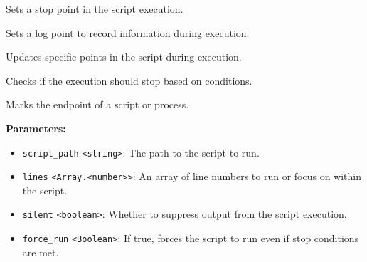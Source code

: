 \documentclass[12pt,a4paper]{article}
\begin{document}
\noindent Sets a stop point in the script execution.

\vspace{5mm}
\noindent {}


\noindent Sets a log point to record information during execution.

\vspace{5mm}
\noindent {}


\noindent Updates specific points in the script during execution.

\vspace{5mm}
\noindent {}


\noindent Checks if the execution should stop based on conditions.

\vspace{5mm}
\noindent {}


\noindent Marks the endpoint of a script or process.

\vspace{5mm}
\noindent {}


\noindent \textbf{Parameters:}
\begin{itemize}
  \item \texttt{script\_path} \texttt{<string>}: The path to the script to run.
  \item \texttt{lines} \texttt{<Array.<number>>}: An array of line numbers to run or focus on within the script.
  \item \texttt{silent} \texttt{<boolean>}: Whether to suppress output from the script execution.
  \item \texttt{force\_run} \texttt{<Boolean>}: If true, forces the script to run even if stop conditions are met.
\end{itemize}
\end{document}
